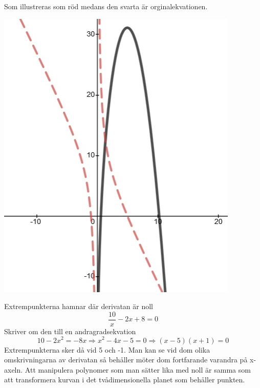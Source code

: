 \documentclass[a4paper,12pt]{article}
\begin{document}
\begin{enumerate}
    Som illustreras som röd medans den svarta är orginalekvationen.
    
    \begin{center}
        \includegraphics[scale=0.6]{Figur 2.jpg}
    \end{center}
    
    Extrempunkterna hamnar där derivatan är noll
    $$\frac{10}{x}-2x+8=0$$
    Skriver om den till en andragradsekvation
    $$10-2x^2=-8x\Rightarrow x^2-4x-5=0\Rightarrow (x-5)(x+1)=0$$
    Extrempunkterna sker då vid 5 och -1.
    Man kan se vid dom olika omskrivningarna av derivatan
    så behåller möter dom fortfarande varandra på x-axeln.
    Att manipulera polynomer som man sätter lika med noll är samma
    som att transformera kurvan i det tvådimensionella planet som behåller
    punkten.


\end{enumerate}
\end{document}
